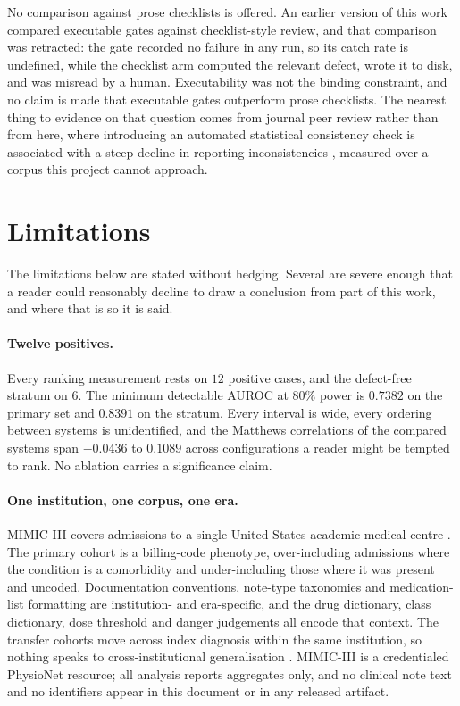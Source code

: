 No comparison against prose checklists is offered. An earlier version of this
work compared executable gates against checklist-style review, and that
comparison was retracted: the gate recorded no failure in any run, so its catch
rate is undefined, while the checklist arm computed the relevant defect, wrote it
to disk, and was misread by a human. Executability was not the binding
constraint, and no claim is made that executable gates outperform prose
checklists. The nearest thing to evidence on that question comes from journal
peer review rather than from here, where introducing an automated statistical
consistency check is associated with a steep decline in reporting
inconsistencies \citep{nuijten2023statcheck}, measured over a corpus this
project cannot approach.

\section{Limitations}
\label{sec:disc-limits}

The limitations below are stated without hedging. Several are severe enough that
a reader could reasonably decline to draw a conclusion from part of this work,
and where that is so it is said.

\paragraph{Twelve positives.} Every ranking measurement rests on $12$ positive
cases, and the defect-free stratum on $6$. The minimum detectable AUROC at $80\%$
power is $0.7382$ on the primary set and $0.8391$ on the stratum. Every interval
is wide, every ordering between systems is unidentified, and the Matthews
correlations of the compared systems span $-0.0436$ to $0.1089$ across
configurations a reader might be tempted to rank. No ablation carries a
significance claim.

\paragraph{One institution, one corpus, one era.} MIMIC-III covers admissions to
a single United States academic medical centre \citep{johnson2016mimic}. The
primary cohort is a billing-code phenotype, over-including admissions where the
condition is a comorbidity and under-including those where it was present and
uncoded. Documentation conventions, note-type taxonomies and medication-list
formatting are institution- and era-specific, and the drug dictionary, class
dictionary, dose threshold and danger judgements all encode that context. The
transfer cohorts move across index diagnosis within the same institution, so
nothing speaks to cross-institutional generalisation
\citep{zech2018generalization}. MIMIC-III is a credentialed PhysioNet resource;
all analysis reports aggregates only, and no clinical note text and no
identifiers appear in this document or in any released artifact.

